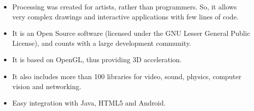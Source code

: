 {\begin{itemize}
\item Processing was created for artists, rather than programmers. So, it allows very complex drawings and interactive applications with few lines of code.
\item It is an Open Source software (licensed under the GNU Lesser General Public License), and counts with a large development community.
\item It is based on OpenGL, thus providing 3D acceleration.
\item It also includes more than 100 libraries for video, sound, physics, computer vision and networking.
\item Easy integration with Java, HTML5 and Android.
\end{itemize}


\begin{figure}
\centering


\end{figure}}
